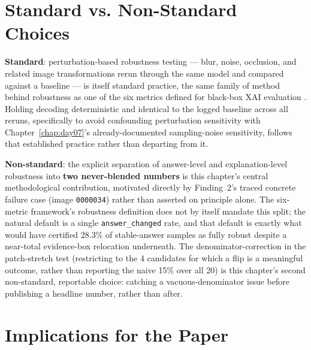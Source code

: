 \section{Standard vs. Non-Standard Choices}

\textbf{Standard}: perturbation-based robustness testing --- blur, noise, occlusion, and related
image transformations rerun through the same model and compared against a baseline --- is itself
standard practice, the same family of method behind robustness as one of the six metrics defined for
black-box XAI evaluation \citep{arreche2024exai}. Holding decoding deterministic and identical to
the logged baseline across all reruns, specifically to avoid confounding perturbation sensitivity
with Chapter~\ref{chap:day07}'s already-documented sampling-noise sensitivity, follows that
established practice rather than departing from it.

\textbf{Non-standard}: the explicit separation of answer-level and explanation-level robustness into
\textbf{two never-blended numbers} is this chapter's central methodological contribution, motivated
directly by Finding~2's traced concrete failure case (image \texttt{0000034}) rather than asserted on
principle alone. The six-metric framework's robustness definition does not by itself mandate this
split; the natural default is a single \texttt{answer\_changed} rate, and that default is exactly
what would have certified 28.3\% of stable-answer samples as fully robust despite a near-total
evidence-box relocation underneath. The denominator-correction in the patch-stretch test (restricting
to the 4 candidates for which a flip is a meaningful outcome, rather than reporting the naive 15\%
over all 20) is this chapter's second non-standard, reportable choice: catching a vacuous-denominator
issue before publishing a headline number, rather than after.

\section{Implications for the Paper}

